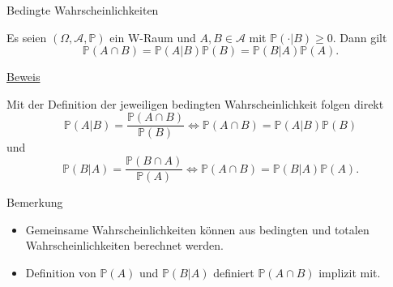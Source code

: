 \documentclass[
  8pt,
  ignorenonframetext,
]{beamer}
\providecommand{\tightlist}{%
  \setlength{\itemsep}{0pt}\setlength{\parskip}{0pt}}
\begin{document}
\begin{frame}{Bedingte Wahrscheinlichkeiten}
\protect\hypertarget{bedingte-wahrscheinlichkeiten-4}{}
\small
\begin{theorem}
\normalfont
Es seien $(\Omega,\mathcal{A}, \mathbb{P})$ ein W-Raum und $A,B\in \mathcal{A}$
mit $\mathbb{P}(\cdot|B) \ge 0$. Dann gilt
\begin{equation}
\mathbb{P}(A \cap B)
= \mathbb{P}(A|B)\mathbb{P}(B)
= \mathbb{P}(B|A)\mathbb{P}(A).
\end{equation}
\end{theorem}

\footnotesize

\underline{Beweis}

Mit der Definition der jeweiligen bedingten Wahrscheinlichkeit folgen
direkt \begin{equation}
\mathbb{P}(A|B) = \frac{\mathbb{P}(A \cap B)}{\mathbb{P}(B)}
\Leftrightarrow 
\mathbb{P}(A \cap B) =\mathbb{P}(A|B)\mathbb{P}(B)
\end{equation} und \begin{equation}
\mathbb{P}(B|A) = \frac{\mathbb{P}(B \cap A)}{\mathbb{P}(A)}
\Leftrightarrow 
\mathbb{P}(A \cap B) =\mathbb{P}(B|A)\mathbb{P}(A).
\end{equation}

Bemerkung

\begin{itemize}
\tightlist
\item
  Gemeinsame Wahrscheinlichkeiten können aus bedingten und totalen
  Wahrscheinlichkeiten berechnet werden.
\item
  Definition von \(\mathbb{P}(A)\) und \(\mathbb{P}(B|A)\) definiert
  \(\mathbb{P}(A \cap B)\) implizit mit.
\end{itemize}
\end{frame}
\end{document}
